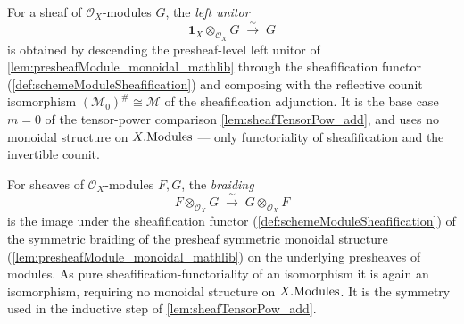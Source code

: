 \begin{definition}

  \label{def:tensorObjUnitIso}
  For a sheaf of \(\mathcal{O}_X\)-modules \(G\), the \emph{left unitor}
  \[
    \mathbf{1}_X \otimes_{\mathcal{O}_X} G \;\xrightarrow{\ \sim\ }\; G
  \]
  is obtained by descending the presheaf-level left unitor of
  \cref{lem:presheafModule_monoidal_mathlib} through the sheafification functor
  (\cref{def:schemeModuleSheafification}) and composing with the reflective counit
  isomorphism \((\mathcal{M}_0)^{\#} \cong \mathcal{M}\) of the sheafification
  adjunction. It is the base case \(m = 0\) of the tensor-power comparison
  \cref{lem:sheafTensorPow_add}, and uses no monoidal structure on
  \(X.\mathrm{Modules}\) --- only functoriality of sheafification and the invertible
  counit.
\end{definition}

\begin{definition}

  \label{def:tensorBraiding}
  For sheaves of \(\mathcal{O}_X\)-modules \(F, G\), the \emph{braiding}
  \[
    F \otimes_{\mathcal{O}_X} G \;\xrightarrow{\ \sim\ }\;
      G \otimes_{\mathcal{O}_X} F
  \]
  is the image under the sheafification functor
  (\cref{def:schemeModuleSheafification}) of the symmetric braiding of the
  presheaf symmetric monoidal structure (\cref{lem:presheafModule_monoidal_mathlib})
  on the underlying presheaves of modules. As pure sheafification-functoriality of
  an isomorphism it is again an isomorphism, requiring no monoidal structure on
  \(X.\mathrm{Modules}\). It is the symmetry used in the inductive step of
  \cref{lem:sheafTensorPow_add}.
\end{definition}

